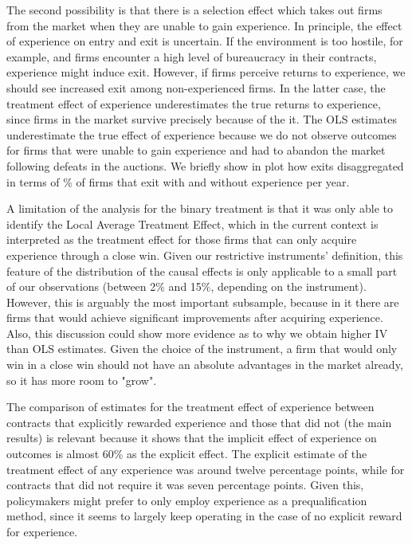 The second possibility is that there is a selection effect which takes out firms from the market when they are unable to gain experience. In principle, the effect of experience on entry and exit is uncertain. If the environment is too hostile, for example, and firms encounter a high level of bureaucracy in their contracts, experience might induce exit. However, if firms perceive returns to experience, we should see increased exit among non-experienced firms. In the latter case, the treatment effect of experience underestimates the true returns to experience, since firms in the market survive precisely because of the it.  The OLS estimates underestimate the true effect of experience because we do not observe outcomes for firms that were unable to gain experience and had to abandon the market following defeats in the auctions. We briefly show in plot how exits disaggregated in terms of \% of firms that exit with and without experience per year.

A limitation of the analysis for the binary treatment is that it was only able to identify the Local Average Treatment Effect, which in the current context is interpreted as the treatment effect for those firms that can only acquire experience through a close win. Given our restrictive instruments' definition, this feature of the distribution of the causal effects is only applicable to a small part of our observations (between 2\% and 15\%, depending on the instrument). However, this is arguably the most important subsample, because in it there are firms that would achieve significant improvements after acquiring experience. Also, this discussion could show more evidence as to why we obtain higher IV than OLS estimates. Given the choice of the instrument, a firm that would only win in a close win should not have an absolute advantages in the market already, so it has more room to "grow".

The comparison of estimates for the treatment effect of experience between contracts that explicitly rewarded experience and those that did not (the main results) is relevant because it shows that the implicit effect of experience on outcomes is almost 60\% as the explicit effect. The explicit estimate of the treatment effect of any experience was around twelve percentage points, while for contracts that did not require it was seven percentage points. Given this, policymakers might prefer to only employ experience as a prequalification method, since it seems to largely keep operating in the case of no explicit reward for experience.

